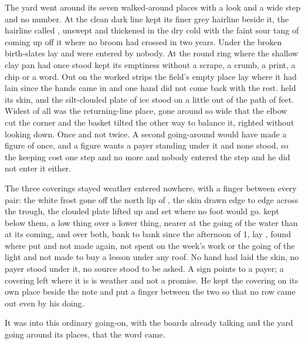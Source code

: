The yard went around its seven walked-around places with a look and a wide step and no number. At  the clean dark line kept its finer grey hairline beside it, the hairline called , unswept and thickened in the dry cold with the faint sour tang of  coming up off it where no broom had crossed in two years. Under  the broken birth-slates lay and were entered by nobody. At  the round ring where the shallow clay pan had once stood kept its emptiness without a scrape, a crumb, a print, a chip or a word. Out on the worked strips the field's empty place lay where it had lain since the hands came in and one hand did not come back with the rest.  held its skin, and the silt-clouded plate of ice stood on  a little out of the path of feet. Widest of all was the returning-line place, gone around so wide that the elbow cut the corner and the basket tilted the other way to balance it, righted without looking down. Once and not twice. A second going-around would have made a figure of once, and a figure wants a payer standing under it and none stood, so the keeping cost one step and no more and nobody entered the step and he did not enter it either.

The three coverings stayed weather entered nowhere, with a finger between every pair: the white frost gone off the north lip of , the skin drawn edge to edge across the trough, the clouded plate lifted up and set where no foot would go.  kept  below them, a low thing over a lower thing, nearer at the going of the water than at its coming, and over both, bank to bank since the afternoon of  1, lay , found where put and not made again, not spent on the week's work or the going of the light and not made to buy a lesson under any roof. No hand had laid the skin, no payer stood under it, no source stood to be asked. A sign points to a payer; a covering left where it is is weather and not a promise. He kept the covering on its own place beside the note and put a finger between the two so that no row came out even by his doing.

\scenebreak

It was into this ordinary going-on, with the boards already talking and the yard going around its places, that the word came.

